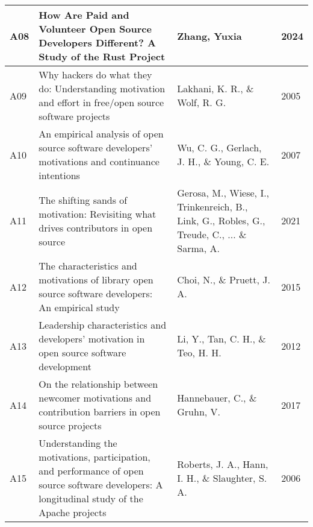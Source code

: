 \begin{landscape}
\begin{center}
\begin{longtable}{ | m{5em} | m{25em}| m{22em} | m{4em} | }
      A08        & How Are Paid and Volunteer Open Source Developers Different? A Study of the Rust Project                                                      & Zhang, Yuxia                                                                                                    & 2024  \\ \hline
      A09        & Why hackers do what they do: Understanding motivation and effort in free/open source software projects                                        & Lakhani, K. R., \& Wolf, R. G.                                                                                  & 2005  \\ \hline
      A10        & An empirical analysis of open source software developers' motivations and continuance intentions                                              & Wu, C. G., Gerlach, J. H., \& Young, C. E.                                                                      & 2007  \\ \hline
      A11        & The shifting sands of motivation: Revisiting what drives contributors in open source                                                          & Gerosa, M., Wiese, I., Trinkenreich, B., Link, G., Robles, G., Treude, C., ... \& Sarma, A.                     & 2021  \\ \hline
      A12        & The characteristics and motivations of library open source software developers: An empirical study                                            & Choi, N., \& Pruett, J. A.                                                                                      & 2015  \\ \hline
      A13        & Leadership characteristics and developers' motivation in open source software development                                                     & Li, Y., Tan, C. H., \& Teo, H. H.                                                                               & 2012  \\ \hline
      A14        & On the relationship between newcomer motivations and contribution barriers in open source projects                                            & Hannebauer, C., \& Gruhn, V.                                                                                    & 2017  \\ \hline
      A15        & Understanding the motivations, participation, and performance of open source software developers: A longitudinal study of the Apache projects & Roberts, J. A., Hann, I. H., \& Slaughter, S. A.                                                                & 2006  \\ \hline

\end{longtable}
\end{center}
\end{landscape}
